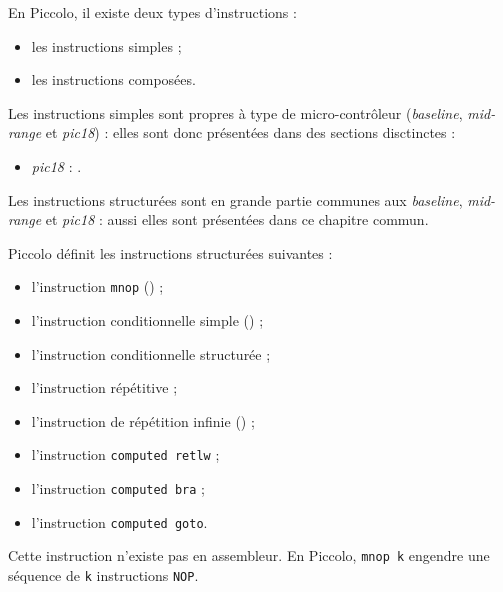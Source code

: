 
\cleardoublepage


\thispagestyle{empty}

En Piccolo, il existe deux types d'instructions :
\begin{itemize}
  \item les instructions simples ;
  \item les instructions composées.
\end{itemize}

Les instructions simples sont propres à type de micro-contrôleur (\emph{baseline}, \emph{mid-range} et \emph{pic18}) : elles sont donc présentées dans des sections disctinctes :
\begin{itemize}
  \item \emph{pic18} : .
\end{itemize}


Les instructions structurées sont en grande partie communes aux \emph{baseline}, \emph{mid-range} et \emph{pic18} : aussi elles sont présentées dans ce chapitre commun.

Piccolo définit les instructions structurées suivantes :
\begin{itemize}
  \item l'instruction \texttt{mnop} () ;
  \item l'instruction conditionnelle simple () ;
  \item l'instruction conditionnelle structurée ;
  \item l'instruction répétitive ;
  \item l'instruction de répétition infinie () ;
  \item l'instruction \texttt{computed retlw} ;
  \item l'instruction \texttt{computed bra} ;
  \item l'instruction \texttt{computed goto}.
\end{itemize}


Cette instruction n'existe pas en assembleur. En Piccolo, \texttt{mnop k} engendre une séquence de \texttt{k} instructions \texttt{NOP}.


